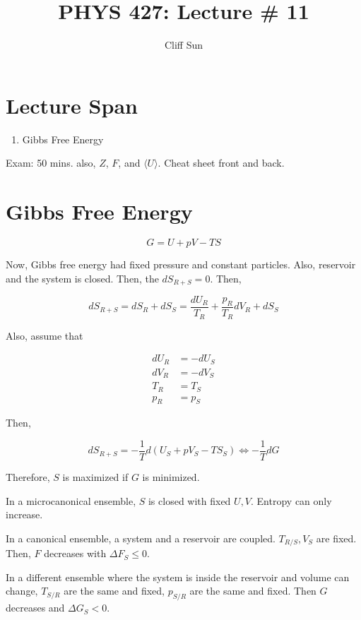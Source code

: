 \documentclass{article}
\title{PHYS 427: Lecture \# 11}
\author{Cliff Sun}
\newtheorem{one minute paper}[theorem]{One Minute Paper}
\begin{document}
\maketitle

\section*{Lecture Span}
\begin{enumerate}
    \item Gibbs Free Energy
\end{enumerate}

Exam: 50 mins. also, $Z$, $F$, and $\langle U \rangle$. Cheat sheet front and back. 

\section{Gibbs Free Energy}

$$G = U + pV - TS$$

Now, Gibbs free energy had fixed pressure and constant particles. Also, reservoir and the system is closed. Then, the $dS_{R + S} = 0$. Then, 

\begin{equation}
    dS_{R + S} = dS_R + dS_S = \frac{dU_R}{T_R} + \frac{p_R}{T_R}dV_R + dS_S
\end{equation}

Also, assume that 

\begin{align}
    dU_R &= -dU_S \\
    dV_R &= -dV_S \\
    T_R &= T_S\\
    p_R &= p_S
\end{align}

Then, 

\begin{equation}
    dS_{R + S} = -\frac{1}{T}d\left( U_S + pV_S - TS_S  \right) \iff -\frac{1}{T}dG
\end{equation}

Therefore, $S$ is maximized if $G$ is minimized. 

In a microcanonical ensemble, $S$ is closed with fixed $U,V$. Entropy can only increase.

In a canonical ensemble, a system and a reservoir are coupled. $T_{R/S},V_S$ are fixed. Then, $F$ decreases with $\Delta F_S \leq 0$. 

In a different ensemble where the system is inside the reservoir and volume can change, $T_{S/R}$ are the same and fixed, $p_{S/R}$ are the same and fixed. Then $G$ decreases and $\Delta G_S < 0$. 
\end{document}
